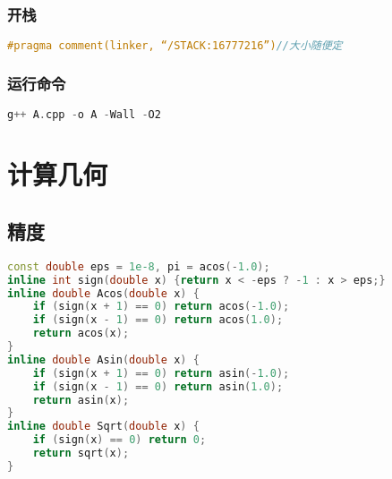 \documentclass[landscape,a4paper]{article}
\begin{document}
	\begin{spacing}{0.3}	
	\begin{multicols}{3}
	
	\tableofcontents
	
	\subsubsection{开栈}
\begin{lstlisting}[language=C++]
#pragma comment(linker, “/STACK:16777216”)//大小随便定
\end{lstlisting}
\subsubsection{运行命令}
\begin{lstlisting}[language=C++]
g++ A.cpp -o A -Wall -O2
\end{lstlisting}
	
\section{计算几何}

\subsection{精度}
\begin{lstlisting}[language=C++]
const double eps = 1e-8, pi = acos(-1.0);
inline int sign(double x) {return x < -eps ? -1 : x > eps;}
inline double Acos(double x) {
	if (sign(x + 1) == 0) return acos(-1.0);
	if (sign(x - 1) == 0) return acos(1.0);
	return acos(x);
}
inline double Asin(double x) {
	if (sign(x + 1) == 0) return asin(-1.0);
	if (sign(x - 1) == 0) return asin(1.0);
	return asin(x);
}
inline double Sqrt(double x) {
	if (sign(x) == 0) return 0;
	return sqrt(x);
}
\end{lstlisting}

\end{multicols}
\end{spacing}
\end{document}
